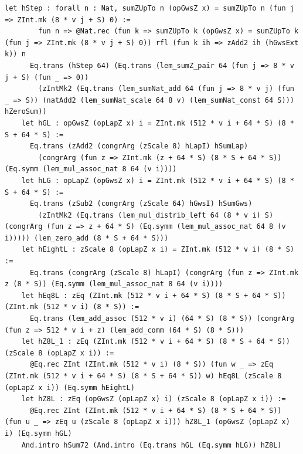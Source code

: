 \documentclass[11pt,letterpaper]{article}
\theoremstyle{spectralthm}
\begin{document}
\begin{lstlisting}[language=Lean4,caption={Standalone Pure Init.Prelude Term-Mode Lean 4 Kernel Suite (thm30--thm61, v0.0.0, 0 sorry, 0 axioms).},label={lst:lean_unified}]
      let hStep : forall n : Nat, sumZUpTo n (opGwsZ x) = sumZUpTo n (fun j => ZInt.mk (8 * v j + S) 0) :=
        fun n => @Nat.rec (fun k => sumZUpTo k (opGwsZ x) = sumZUpTo k (fun j => ZInt.mk (8 * v j + S) 0)) rfl (fun k ih => zAdd2 ih (hGwsExt k)) n
      Eq.trans (hStep 64) (Eq.trans (lem_sumZ_pair 64 (fun j => 8 * v j + S) (fun _ => 0))
        (zIntMk2 (Eq.trans (lem_sumNat_add 64 (fun j => 8 * v j) (fun _ => S)) (natAdd2 (lem_sumNat_scale 64 8 v) (lem_sumNat_const 64 S))) hZeroSum))
    let hGL : opGwsZ (opLapZ x) i = ZInt.mk (512 * v i + 64 * S) (8 * S + 64 * S) :=
      Eq.trans (zAdd2 (congrArg (zScale 8) hLapI) hSumLap)
        (congrArg (fun z => ZInt.mk (z + 64 * S) (8 * S + 64 * S)) (Eq.symm (lem_mul_assoc_nat 8 64 (v i))))
    let hLG : opLapZ (opGwsZ x) i = ZInt.mk (512 * v i + 64 * S) (8 * S + 64 * S) :=
      Eq.trans (zSub2 (congrArg (zScale 64) hGwsI) hSumGws)
        (zIntMk2 (Eq.trans (lem_mul_distrib_left 64 (8 * v i) S) (congrArg (fun z => z + 64 * S) (Eq.symm (lem_mul_assoc_nat 64 8 (v i))))) (lem_zero_add (8 * S + 64 * S)))
    let hEightL : zScale 8 (opLapZ x i) = ZInt.mk (512 * v i) (8 * S) :=
      Eq.trans (congrArg (zScale 8) hLapI) (congrArg (fun z => ZInt.mk z (8 * S)) (Eq.symm (lem_mul_assoc_nat 8 64 (v i))))
    let hEq8L : zEq (ZInt.mk (512 * v i + 64 * S) (8 * S + 64 * S)) (ZInt.mk (512 * v i) (8 * S)) :=
      Eq.trans (lem_add_assoc (512 * v i) (64 * S) (8 * S)) (congrArg (fun z => 512 * v i + z) (lem_add_comm (64 * S) (8 * S)))
    let hZ8L_1 : zEq (ZInt.mk (512 * v i + 64 * S) (8 * S + 64 * S)) (zScale 8 (opLapZ x i)) :=
      @Eq.rec ZInt (ZInt.mk (512 * v i) (8 * S)) (fun w _ => zEq (ZInt.mk (512 * v i + 64 * S) (8 * S + 64 * S)) w) hEq8L (zScale 8 (opLapZ x i)) (Eq.symm hEightL)
    let hZ8L : zEq (opGwsZ (opLapZ x) i) (zScale 8 (opLapZ x i)) :=
      @Eq.rec ZInt (ZInt.mk (512 * v i + 64 * S) (8 * S + 64 * S)) (fun u _ => zEq u (zScale 8 (opLapZ x i))) hZ8L_1 (opGwsZ (opLapZ x) i) (Eq.symm hGL)
    And.intro hSum72 (And.intro (Eq.trans hGL (Eq.symm hLG)) hZ8L)


\end{lstlisting}
\end{document}
